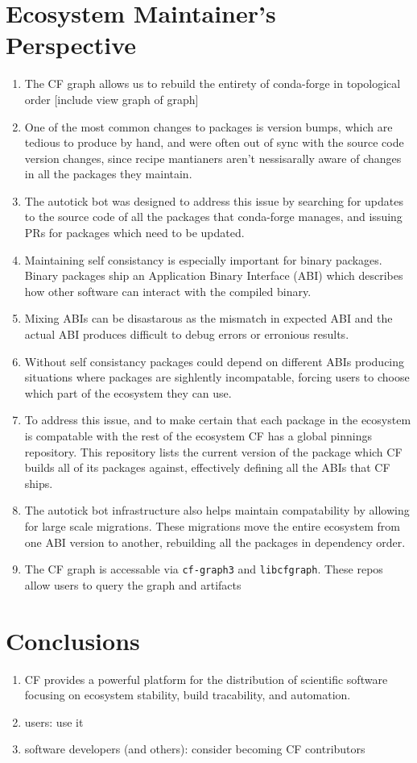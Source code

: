 \documentclass[fleqn,10pt,lineno]{wlpeerj} %
\newcounter{saveenumi}
\newcommand{\seti}{\setcounter{saveenumi}{\value{enumi}}}
\newcommand{\conti}{\setcounter{enumi}{\value{saveenumi}}}
\begin{document}
\section*{Ecosystem Maintainer's Perspective}
\begin{enumerate}\conti
\item The CF graph allows us to rebuild the entirety of conda-forge in
topological order [include view graph of graph]
\item One of the most common changes to packages is version bumps, which are
tedious to produce by hand, and were often out of sync with the source code
version changes, since recipe mantianers aren't nessisarally aware of 
changes in all the packages they maintain.
\item The autotick bot was designed to address this issue by searching for
updates to the source code of all the packages that conda-forge manages,
and issuing PRs for packages which need to be updated.
\item Maintaining self consistancy is especially important for binary packages.
Binary packages ship an Application Binary Interface (ABI) which describes how other software
can interact with the compiled binary.
\item Mixing ABIs can be disastarous as the mismatch in expected ABI and 
the actual ABI produces difficult to debug errors or erronious results.
\item Without self consistancy packages could depend on different ABIs
producing situations where packages are sighlently incompatable, forcing
users to choose which part of the ecosystem they can use.
\item To address this issue, and to make certain that each package in the 
ecosystem is compatable with the rest of the ecosystem CF has a global 
pinnings repository.
This repository lists the current version of the package which CF builds
all of its packages against, effectively defining all the ABIs that CF ships.
\item The autotick bot infrastructure also helps maintain compatability by
allowing for large scale migrations. These migrations move the entire ecosystem
from one ABI version to another, rebuilding all the packages in dependency
order.
\item The CF graph is accessable via \texttt{cf-graph3} and \texttt{libcfgraph}.
These repos allow users to query the graph and artifacts
\end{enumerate}\seti


\section*{Conclusions}
\begin{enumerate}\conti
\item CF provides a powerful platform for the distribution of scientific
software focusing on ecosystem stability, build tracability, and automation.
\item users: use it
\item software developers (and others): consider becoming CF contributors
\end{enumerate}\seti
\end{document}
